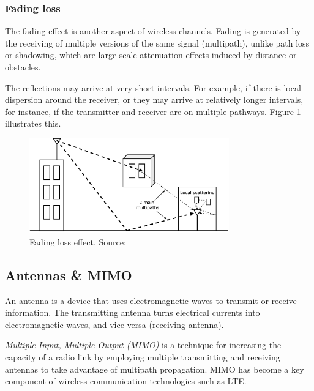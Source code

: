 \subsubsection{Fading loss} 

The fading effect is another aspect of wireless channels. Fading is generated by the receiving 
of multiple versions of the same signal (multipath), unlike path loss or shadowing, which are large-scale 
attenuation effects induced by distance or obstacles.

The reflections may arrive at very short intervals. For example, if there is local dispersion 
around the receiver, or they may arrive at relatively longer intervals, for instance, if the 
transmitter and receiver are on multiple pathways. Figure \ref{fig:fading} illustrates this.

\begin{figure}[]
  \centering
  \includegraphics[width=0.77\textwidth]{img/fading.png}
  \caption{Fading loss effect. Source:\cite{lte2} }
  \label{fig:fading}
\end{figure}

\subsection{Antennas \& MIMO}

An antenna is a device that uses electromagnetic waves to transmit or receive information.
The transmitting antenna turns electrical currents into electromagnetic waves, 
and vice versa (receiving antenna).

\textit{Multiple Input, Multiple Output (MIMO)} is a technique for increasing the capacity 
of a radio link by employing multiple transmitting and receiving antennas to take advantage
of multipath propagation. MIMO has become a key component of wireless communication technologies 
such as LTE.

